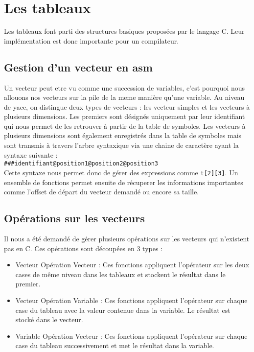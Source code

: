 \section{Les tableaux}

Les tableaux font parti des structures basiques proposées par le langage C. Leur implémentation est donc importante pour un compilateur. 

\subsection{Gestion d'un vecteur en asm}

Un vecteur peut etre vu comme une succession de variables, c'est pourquoi nous allouons nos vecteurs sur la pile de la meme manière qu'une variable. Au niveau de yacc, on distingue deux types de vecteurs : les vecteur simples et les vecteurs à plusieurs dimensions. Les premiers sont désignés uniquement par leur identifiant qui nous permet de les retrouver à partir de la table de symboles. Les vecteurs à plusieurs dimensions sont également enregistrés dans la table de symboles mais sont transmis à travers l'arbre syntaxique via une chaine de caractère ayant la syntaxe suivante : \\
\verb?###identifiant@position1@position2@position3? \\
Cette syntaxe nous permet donc de gérer des expressions comme \verb?t[2][3]?. Un ensemble de fonctions permet ensuite de récuperer les informations importantes comme l'offset de départ du vecteur demandé ou encore sa taille.

\subsection{Opérations sur les vecteurs}

Il nous a été demandé de gérer plusieurs opérations sur les vecteurs qui n'existent pas en C. Ces opérations sont découpées en 3 types :
\begin{itemize}
\item Vecteur Opération Vecteur : Ces fonctions appliquent l'opérateur sur les deux cases de m\^eme niveau dans les tableaux et stockent le résultat dans le premier.
\item Vecteur Opération Variable : Ces fonctions appliquent l'opérateur sur chaque case du tableau avec la valeur contenue dans la variable. Le résultat est stocké dans le vecteur.
\item Variable Opération Vecteur : Ces fonctions appliquent l'opérateur sur chaque case du tableau successivement et met le résultat dans la variable.
\end{itemize}

